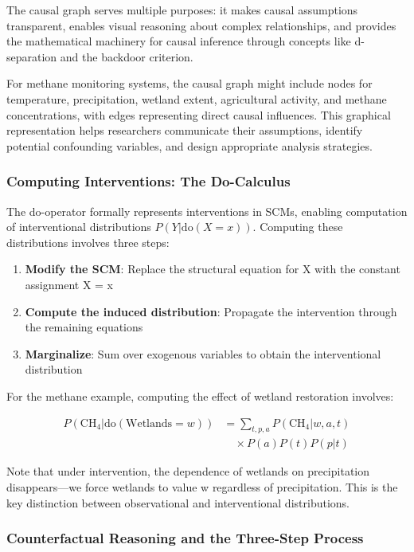 The causal graph serves multiple purposes: it makes causal assumptions transparent, enables visual reasoning about complex relationships, and provides the mathematical machinery for causal inference through concepts like d-separation and the backdoor criterion.

For methane monitoring systems, the causal graph might include nodes for temperature, precipitation, wetland extent, agricultural activity, and methane concentrations, with edges representing direct causal influences. This graphical representation helps researchers communicate their assumptions, identify potential confounding variables, and design appropriate analysis strategies.

\subsubsection{Computing Interventions: The Do-Calculus}

The do-operator formally represents interventions in SCMs, enabling computation of interventional distributions $P(Y|\text{do}(X=x))$. Computing these distributions involves three steps:

\begin{enumerate}
	\item \textbf{Modify the SCM}: Replace the structural equation for X with the constant assignment X = x
	\item \textbf{Compute the induced distribution}: Propagate the intervention through the remaining equations
	\item \textbf{Marginalize}: Sum over exogenous variables to obtain the interventional distribution
\end{enumerate}

For the methane example, computing the effect of wetland restoration involves:

\begin{align}
	P(\text{CH}_4|\text{do}(\text{Wetlands}=w)) & = \sum_{t,p,a} P(\text{CH}_4|w,a,t) \\
	                                            & \quad \times P(a)P(t)P(p|t)
\end{align}

Note that under intervention, the dependence of wetlands on precipitation disappears—we force wetlands to value w regardless of precipitation. This is the key distinction between observational and interventional distributions.

\subsubsection{Counterfactual Reasoning and the Three-Step Process}

